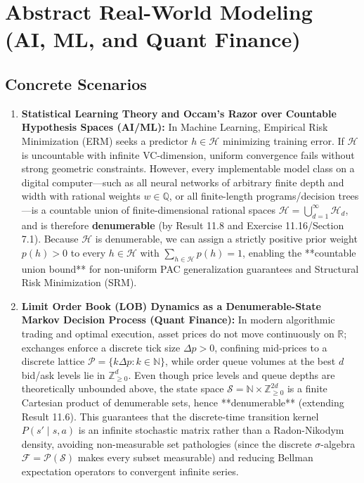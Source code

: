 \documentclass[11pt, letterpaper]{article}
\theoremstyle{definition}
\theoremstyle{remark}
\begin{document}
\section{Abstract Real-World Modeling (AI, ML, and Quant Finance)}

\subsection{Concrete Scenarios}

\begin{enumerate}[label=\textbf{\arabic*.}]
    \item \textbf{Statistical Learning Theory and Occam's Razor over Countable Hypothesis Spaces (AI/ML):}
    In Machine Learning, Empirical Risk Minimization (ERM) seeks a predictor $h \in \mathcal{H}$ minimizing training error. If $\mathcal{H}$ is uncountable with infinite VC-dimension, uniform convergence fails without strong geometric constraints. However, every implementable model class on a digital computer---such as all neural networks of arbitrary finite depth and width with rational weights $w \in \mathbb{Q}$, or all finite-length programs/decision trees---is a countable union of finite-dimensional rational spaces $\mathcal{H} = \bigcup_{d=1}^\infty \mathcal{H}_d$, and is therefore \textbf{denumerable} (by Result 11.8 and Exercise 11.16/Section 7.1). Because $\mathcal{H}$ is denumerable, we can assign a strictly positive prior weight $p(h) > 0$ to every $h \in \mathcal{H}$ with $\sum_{h \in \mathcal{H}} p(h) = 1$, enabling the **countable union bound** for non-uniform PAC generalization guarantees and Structural Risk Minimization (SRM).

    \item \textbf{Limit Order Book (LOB) Dynamics as a Denumerable-State Markov Decision Process (Quant Finance):}
    In modern algorithmic trading and optimal execution, asset prices do not move continuously on $\mathbb{R}$; exchanges enforce a discrete tick size $\Delta p > 0$, confining mid-prices to a discrete lattice $\mathcal{P} = \{k \Delta p : k \in \mathbb{N}\}$, while order queue volumes at the best $d$ bid/ask levels lie in $\mathbb{Z}_{\geq 0}^d$. Even though price levels and queue depths are theoretically unbounded above, the state space $\mathcal{S} = \mathbb{N} \times \mathbb{Z}_{\geq 0}^{2d}$ is a finite Cartesian product of denumerable sets, hence **denumerable** (extending Result 11.6). This guarantees that the discrete-time transition kernel $P(s' \mid s, a)$ is an infinite stochastic matrix rather than a Radon-Nikodym density, avoiding non-measurable set pathologies (since the discrete $\sigma$-algebra $\mathcal{F} = \mathcal{P}(\mathcal{S})$ makes every subset measurable) and reducing Bellman expectation operators to convergent infinite series.


\end{enumerate}
\end{document}
